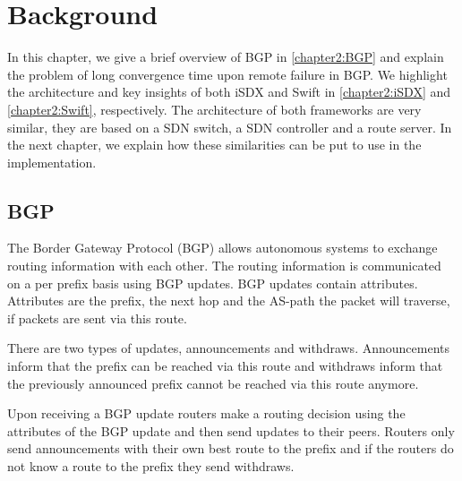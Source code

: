 
\chapter{\label{chapter2}Background}

In this chapter, we give a brief overview of BGP in \ref{chapter2:BGP} and explain the problem of long convergence time upon remote failure in BGP. We highlight the architecture and key insights of both iSDX and Swift in \ref{chapter2:iSDX} and \ref{chapter2:Swift}, respectively. The architecture of both frameworks are very similar, they are based on a SDN switch, a SDN controller and a route server. In the next chapter, we explain how these similarities can be put to use in the implementation.

\section{\label{chapter2:BGP}BGP}

The Border Gateway Protocol (BGP) allows autonomous systems to exchange routing information with each other. The routing information is communicated on a per prefix basis using BGP updates. BGP updates contain attributes. Attributes are the prefix, the next hop and the AS-path the packet will traverse, if packets are sent via this route. 

There are two types of updates, announcements and withdraws. Announcements inform that the prefix can be reached via this route and withdraws inform that the previously announced prefix cannot be reached via this route anymore. 

Upon receiving a BGP update routers make a routing decision using the attributes of the BGP update and then send updates to their peers. Routers only send announcements with their own best route to the prefix and if the routers do not know a route to the prefix they send withdraws.

